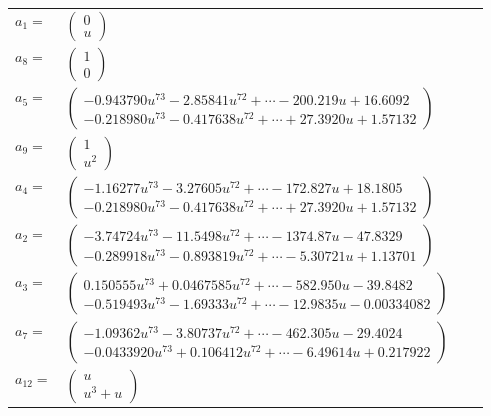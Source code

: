 \documentclass[1p]{elsarticle_modified}
\theoremstyle{definition}
\begin{document}
\begin{tabular}{m{7pt} m{180pt} m{7pt} m{180pt} }
\flushright $a_{1}=$&$\begin{pmatrix}0\\u\end{pmatrix}$ \\
\flushright $a_{8}=$&$\begin{pmatrix}1\\0\end{pmatrix}$ \\
\flushright $a_{5}=$&$\begin{pmatrix}-0.943790 u^{73}-2.85841 u^{72}+\cdots-200.219 u+16.6092\\-0.218980 u^{73}-0.417638 u^{72}+\cdots+27.3920 u+1.57132\end{pmatrix}$ \\
\flushright $a_{9}=$&$\begin{pmatrix}1\\u^2\end{pmatrix}$ \\
\flushright $a_{4}=$&$\begin{pmatrix}-1.16277 u^{73}-3.27605 u^{72}+\cdots-172.827 u+18.1805\\-0.218980 u^{73}-0.417638 u^{72}+\cdots+27.3920 u+1.57132\end{pmatrix}$ \\
\flushright $a_{2}=$&$\begin{pmatrix}-3.74724 u^{73}-11.5498 u^{72}+\cdots-1374.87 u-47.8329\\-0.289918 u^{73}-0.893819 u^{72}+\cdots-5.30721 u+1.13701\end{pmatrix}$ \\
\flushright $a_{3}=$&$\begin{pmatrix}0.150555 u^{73}+0.0467585 u^{72}+\cdots-582.950 u-39.8482\\-0.519493 u^{73}-1.69333 u^{72}+\cdots-12.9835 u-0.00334082\end{pmatrix}$ \\
\flushright $a_{7}=$&$\begin{pmatrix}-1.09362 u^{73}-3.80737 u^{72}+\cdots-462.305 u-29.4024\\-0.0433920 u^{73}+0.106412 u^{72}+\cdots-6.49614 u+0.217922\end{pmatrix}$ \\
\flushright $a_{12}=$&$\begin{pmatrix}u\\u^3+u\end{pmatrix}$ \\

\end{tabular}
\end{document}
